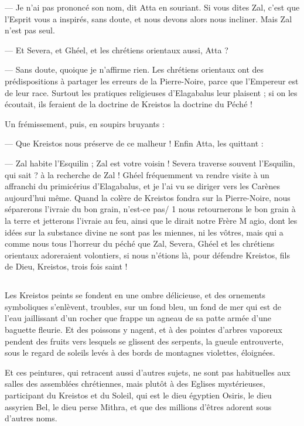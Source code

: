 \documentclass[a4paper, 11pt, oneside, polutonikogreek, french]{article}
\begin{document}
--- Je n'ai pas prononcé son nom, dit Atta en souriant. Si vous dites Zal, c'est que l'Esprit vous a inspirés, sans doute, et nous devons alors nous incliner. Mais Zal n'est pas seul.

--- Et Severa, et Ghéel, et les chrétiens orientaux aussi, Atta ?

--- Sans doute, quoique je n'affirme rien. Les chrétiens orientaux ont des prédispositions à partager les erreurs de la Pierre-Noire, parce que l'Empereur est de leur race. Surtout les pratiques religieuses d'Elagabalus leur plaisent ; si on les écoutait, ils feraient de la doctrine de Kreistos la doctrine du Péché !

Un frémissement, puis, en soupirs bruyants :

--- Que Kreistos nous préserve de ce malheur ! Enfin Atta, les quittant :

--- Zal habite l'Esquilin ; Zal est votre voisin ! Severa traverse souvent l'Esquilin, qui sait ? à la recherche de Zal ! Ghéel fréquemment va rendre visite à un affranchi du primicérius d'Elagabalus, et je l'ai vu se diriger vers les Carènes aujourd'hui même. Quand la colère de Kreistos fondra sur la Pierre-Noire, nous séparerons l'ivraie du bon grain, n'est-ce pas/ 1 nous retournerons le bon grain à la terre et jetterons l'ivraie au feu, ainsi que le dirait notre Frère M agio, dont les idées sur la substance divine ne sont pas les miennes, ni les vôtres, mais qui a comme nous tous l'horreur du péché que Zal, Severa, Ghéel et les chrétiens orientaux adoreraient volontiers, si nous n'étions là, pour défendre Kreistos, fils de Dieu, Kreistos, trois fois saint !
\clearpage
\subsection{}
\paragraph{}
Les Kreistos peints se fondent en une ombre délicieuse, et des ornements symboliques s'enlèvent, troubles, sur un fond bleu, un fond de mer qui est de l'eau jaillissant d'un rocher que frappe un agneau de sa patte armée d'une baguette fleurie. Et des poissons y nagent, et à des pointes d'arbres vaporeux pendent des fruits vers lesquels se glissent des serpents, la gueule entrouverte, sous le regard de soleils levés à des bords de montagnes violettes, éloignées.

Et ces peintures, qui retracent aussi d'autres sujets, ne sont pas habituelles aux salles des assemblées chrétiennes, mais plutôt à des Eglises mystérieuses, participant du Kreistos et du Soleil, qui est le dieu égyptien Osiris, le dieu assyrien Bel, le dieu perse Mithra, et que des millions d'êtres adorent sous d'autres noms.
\end{document}
